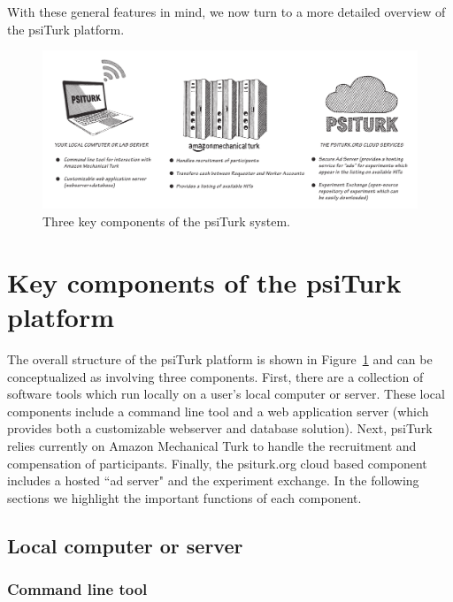 \documentclass[twocolumn]{svjour3}          %
\begin{document}
With these general features in mind, we now turn to a more detailed overview of the 
\textsf{psiTurk} platform.

\begin{figure}[tp]
\centering
\includegraphics[scale=.40]{figures/psiturk-components.pdf}
\caption{Three key components of the \textsf{psiTurk} system.  }
\label{fig:components}
\end{figure}


\section{Key components of the \textsf{psiTurk} platform}

The overall structure of the \textsf{psiTurk} platform is shown in Figure~\ref{fig:components}
and can be conceptualized as involving three components.
First, there are a collection of software tools which run locally on a user's
local computer or server.  These local components include a command line tool and 
a web application server (which provides both a customizable webserver and 
database solution).  Next, \textsf{psiTurk} relies currently on Amazon
Mechanical Turk to handle the recruitment and compensation of participants.
Finally, the \textsf{psiturk.org} cloud based component includes a hosted ``ad server" 
and the experiment exchange.  In the following sections we highlight the important 
functions of each component.

\subsection{Local computer or server}

\subsubsection{Command line tool}
\end{document}
